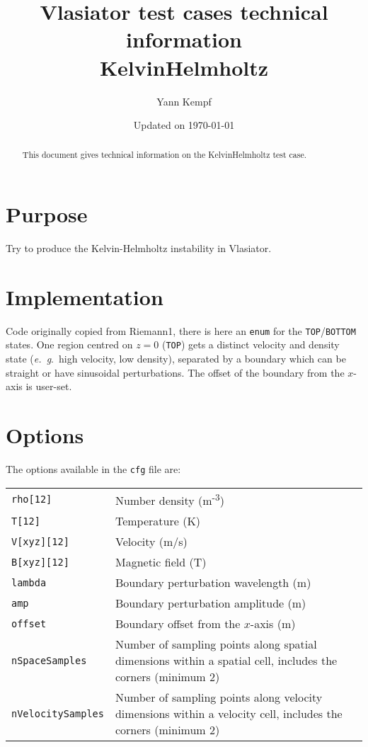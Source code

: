 \documentclass[a4paper,10pt]{scrartcl}
\title{
\Huge{Vlasiator test cases technical information} \\
\LARGE{KelvinHelmholtz}
}
\author{Yann Kempf}
\date{Updated on \today}
\begin{document}
\maketitle

\begin{abstract}
   This document gives technical information on the KelvinHelmholtz test case.
\end{abstract}

\section{Purpose}
Try to produce the Kelvin-Helmholtz instability in Vlasiator.


\section{Implementation}
Code originally copied from Riemann1, there is here an \verb=enum= for the \verb=TOP=/\verb=BOTTOM= states. One region centred on $z=0$ (\verb=TOP=) gets a distinct velocity and density state (\textit{e.\ g}.\ high velocity, low density), separated by a boundary which can be straight or have sinusoidal perturbations. The offset of the boundary from the $x$-axis is user-set.

\section{Options}
The options available in the \verb=cfg= file are:

\begin{tabularx}{\textwidth}{lX}
   \verb=rho[12]= & Number density (m\textsuperscript{-3}) \\
   \verb=T[12]= & Temperature (K) \\
   \verb=V[xyz][12]= & Velocity (m/s) \\
   \verb=B[xyz][12]= & Magnetic field (T) \\
   \verb=lambda= & Boundary perturbation wavelength (m) \\
   \verb=amp= & Boundary perturbation amplitude (m) \\
   \verb=offset= & Boundary offset from the $x$-axis (m) \\
   \verb=nSpaceSamples= & Number of sampling points along spatial dimensions within a spatial cell, includes the corners (minimum 2) \\
   \verb=nVelocitySamples= & Number of sampling points along velocity dimensions within a velocity cell, includes the corners (minimum 2)
\end{tabularx}
\end{document}
